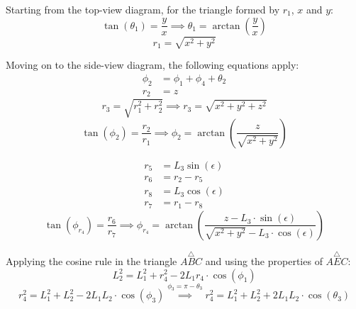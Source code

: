 \documentclass[a4paper,12pt]{article}
\begin{document}
Starting from the top-view diagram, for the triangle formed by $r_{1}$, $x$ and $y$:\\
\begin{equation}
\label{eq:theta1Sol}
    \tan(\theta_{1}) = \frac{y}{x} \implies \boxed{\theta_{1} = \arctan\left(\frac{y}{x}\right)}
\end{equation}
\begin{equation}
    r_{1} = \sqrt{x^{2} + y^{2}}
\end{equation}

Moving on to the side-view diagram, the following equations apply:\\
\begin{equation}
\begin{aligned}
    \phi_{2} & = \phi_{1} + \phi_{4} + \theta_{2}\\
    r_{2} & = z
\end{aligned}
\end{equation}
\begin{equation}
    r_{3}  = \sqrt{r_{1}^{2} + r_{2}^{2}} \implies r_{3} = \sqrt{x^{2} + y^{2} + z^{2}}
\end{equation}
\begin{equation}
    \tan(\phi_{2}) = \frac{r_{2}}{r_{1}} \implies \phi_{2} = \arctan\left(\frac{z}{\sqrt{x^{2} + y^{2}}}\right)
\end{equation}

\begin{equation}
\begin{aligned}
    r_{5} & = L_{3}\sin(\epsilon)\\
    r_{6} & = r_{2} - r_{5}\\
    r_{8} & = L_{3}\cos(\epsilon)\\    
    r_{7} & = r_{1} - r_{8}
\end{aligned}
\end{equation}
\begin{equation}
     \tan(\phi_{r_{4}}) = \frac{r_{6}}{r_{7}} \implies \phi_{r_{4}} = \arctan\left(\frac{z - L_{3}\cdot\sin(\epsilon)}{\sqrt{x^{2} + y^{2}} - L_{3}\cdot\cos(\epsilon)}\right)
\end{equation}

Applying the cosine rule in the triangle $\overset{\triangle}{ABC}$ and using the properties of $\overset{\triangle}{AEC}$:\\
\begin{equation}
\label{eq:phi1}
    L_{2}^{2} = L_{1}^{2} + r_{4}^{2} - 2L_{1}r_{4}\cdot\cos(\phi_{1})
\end{equation}
\begin{equation}
\label{eq:abc_r4}
    r_{4}^{2} = L_{1}^{2} + L_{2}^{2} - 2L_{1}L_{2}\cdot\cos(\phi_{3}) \overset{\phi_{3} = \pi - \theta_{3}}{\implies} r_{4}^{2} = L_{1}^{2} + L_{2}^{2} + 2L_{1}L_{2}\cdot\cos(\theta_{3})
\end{equation}
\end{document}
